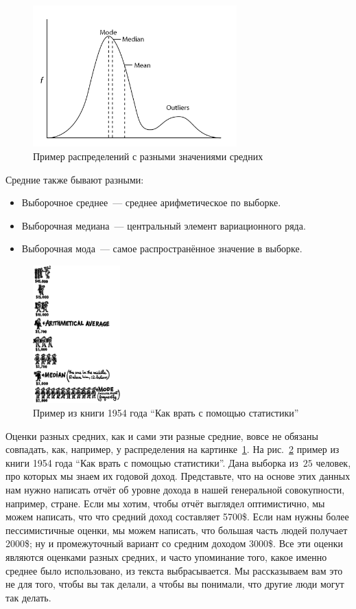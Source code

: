 \begin{figure}[!htb]\center
\includegraphics[width=0.7\textwidth]{lectures/lect1/src/mmm.png}
\caption{Пример распределений с разными значениями средних}
\label{fg:lect1:fig-7}
\end{figure}
Средние также бывают разными:
\begin{itemize}
    \item Выборочное среднее~--- среднее арифметическое по выборке.
    \item Выборочная медиана~--- центральный элемент вариационного ряда.
    \item Выборочная мода~--- самое распространённое значение в выборке.
\end{itemize}


\begin{figure}[!htb]\center
\includegraphics[width=0.3\textwidth]{lectures/lect1/src/howto.png}
\caption{Пример из книги 1954 года ``Как врать с помощью статистики''}
\label{fg:lect1:fig-10}
\end{figure}
Оценки разных средних, как и сами эти разные средние, вовсе не обязаны совпадать, как, например, у распределения на картинке~\ref{fg:lect1:fig-7}. На рис.~\ref{fg:lect1:fig-10} пример из книги 1954 года ``Как врать с помощью статистики''. Дана выборка из~$25$ человек, про которых мы знаем их годовой доход. Представьте, что на основе этих данных нам нужно написать отчёт об уровне дохода в нашей генеральной совокупности, например, стране. Если мы хотим, чтобы отчёт выглядел оптимистично, мы можем написать, что что средний доход составляет 5700\$. Если нам нужны более пессимистичные оценки, мы можем написать, что большая часть людей получает 2000\$; ну и промежуточный вариант со средним доходом 3000\$. Все эти оценки являются оценками разных средних, и часто упоминание того, какое именно среднее было использовано, из текста выбрасывается. Мы рассказываем вам это не для того, чтобы вы так делали, а чтобы вы понимали, что другие люди могут так делать.

